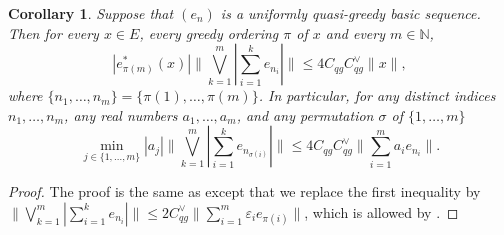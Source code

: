 \documentclass[12pt,leqno]{amsart}
\newtheorem{proposition}[theorem]{Proposition}
\newtheorem{corollary}[theorem]{Corollary}
\numberwithin{equation}{section}
\theoremstyle{definition}
\newtheorem{question}[theorem]{Question}
\def\N{{\mathbb N}}
\begin{document}

\begin{corollary}
Suppose that $(e_n)$ is a uniformly quasi-greedy basic sequence. Then for every $x\in E$, every greedy ordering $\pi$ of $x$ and every $m\in \N$,
$$\left|e^*_{\pi(m)}(x)\right|\bigg\|\bigvee_{k=1}^m\left|\sum_{i=1}^ke_{n_i}\right|\bigg\|\leq 4C_{qg}C_{qg}^\vee\|x\|,$$
where $\{n_1,\dots, n_m\}=\{\pi(1),\dots,\pi(m)\}$. In particular, for any distinct indices $n_1,\dots, n_m$, any real numbers $a_1,\dots,a_m$, and any permutation $\sigma$ of $\{1,\dots,m\}$
$$\min_{j\in\{1,\dots,m\}} |a_j|\bigg\|\bigvee_{k=1}^m\left|\sum_{i=1}^ke_{n_{\sigma(i)}}\right|\bigg\|\leq 4C_{qg}C_{qg}^\vee\bigg\|\sum_{i=1}^ma_ie_{n_i}\bigg\|.$$

\end{corollary}
\begin{proof}
The proof is the same as \cite[Theorem 10.2.12]{AK16} except that we replace  the first inequality by $\|\bigvee_{k=1}^m\left|\sum_{i=1}^ke_{n_i}\right|\|\leq 2C_{qg}^\vee \|\sum_{i=1}^m\varepsilon_ie_{\pi(i)}\|$, which is allowed by .



\end{proof}
\end{document}

